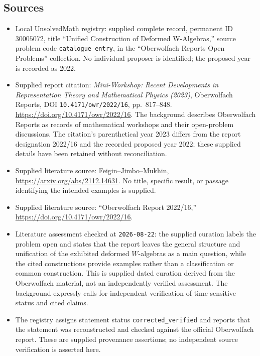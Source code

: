 \documentclass[11pt]{article}
\begin{document}
\subsection{Sources}
\begin{itemize}
\item Local UnsolvedMath registry: supplied complete record, permanent ID \(30005072\), title ``Unified Construction of Deformed W-Algebras,'' source problem code \texttt{catalogue entry}, in the ``Oberwolfach Reports Open Problems'' collection. No individual proposer is identified; the proposed year is recorded as 2022.
\item Supplied report citation: \emph{Mini-Workshop: Recent Developments in Representation Theory and Mathematical Physics (2023)}, Oberwolfach Reports, DOI \texttt{10.4171/owr/2022/16}, pp.~817--848. \url{https://doi.org/10.4171/owr/2022/16}. The background describes Oberwolfach Reports as records of mathematical workshops and their open-problem discussions. The citation's parenthetical year 2023 differs from the report designation 2022/16 and the recorded proposed year 2022; these supplied details have been retained without reconciliation.
\item Supplied literature source: Feigin--Jimbo--Mukhin, \url{https://arxiv.org/abs/2112.14631}. No title, specific result, or passage identifying the intended examples is supplied.
\item Supplied literature source: ``Oberwolfach Report 2022/16,'' \url{https://doi.org/10.4171/owr/2022/16}.
\item Literature assessment checked at \texttt{2026-08-22}: the supplied curation labels the problem open and states that the report leaves the general structure and unification of the exhibited deformed \(W\)-algebras as a main question, while the cited constructions provide examples rather than a classification or common construction. This is supplied dated curation derived from the Oberwolfach material, not an independently verified assessment. The background expressly calls for independent verification of time-sensitive status and cited claims.
\item The registry assigns statement status \texttt{corrected\_verified} and reports that the statement was reconstructed and checked against the official Oberwolfach report. These are supplied provenance assertions; no independent source verification is asserted here.
\end{itemize}
\end{document}
